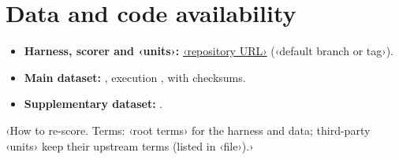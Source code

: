 \section*{Data and code availability}
\label{sec:availability}
\begin{itemize}
  \item \textbf{Harness, scorer and ‹units›:} \url{‹repository URL›} (‹default branch or tag›).
  \item \textbf{Main dataset:} , execution , with checksums.
  \item \textbf{Supplementary dataset:} .
\end{itemize}
‹How to re-score. Terms: ‹root terms› for the harness and data; third-party ‹units› keep their upstream terms (listed in ‹file›).›
